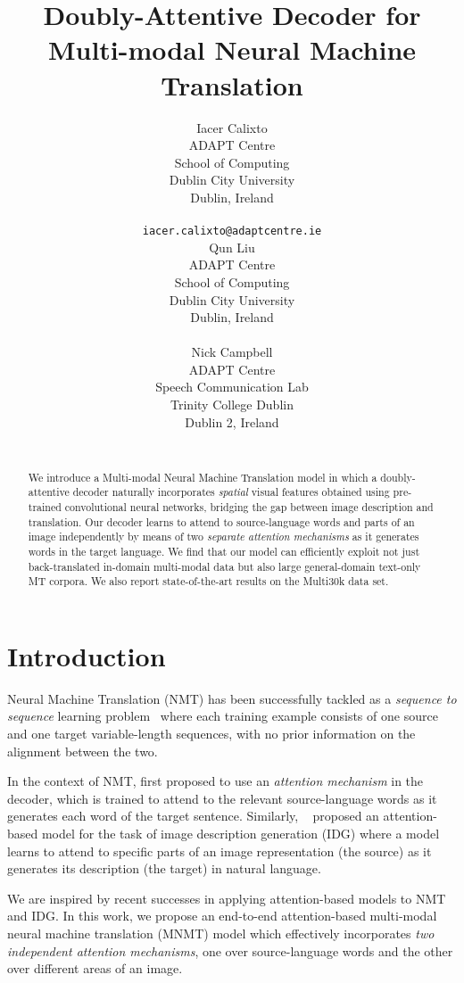 \documentclass[11pt]{article}
\title{Doubly-Attentive Decoder for Multi-modal Neural Machine Translation}
\author{Iacer Calixto \\
  ADAPT Centre\\
  School of Computing\\
  Dublin City University\\
  Dublin, Ireland\\
  \\
  {\tt {\small iacer.calixto@adaptcentre.ie}}\\
  \And
  Qun Liu \\
  ADAPT Centre\\
  School of Computing\\
  Dublin City University\\
  Dublin, Ireland\\
  \\
\And
  Nick Campbell \\
  ADAPT Centre\\
  Speech Communication Lab\\
  Trinity College Dublin\\
  Dublin 2, Ireland\\
  \\
}
\date{}
\begin{document}
\maketitle
\begin{abstract}
 We introduce a Multi-modal Neural Machine Translation model in which a doubly-attentive decoder naturally incorporates \emph{spatial} visual features obtained using pre-trained convolutional neural networks, bridging the gap between image description and translation.
 Our decoder learns to attend to source-language words and parts of an image independently by means of two \emph{separate attention mechanisms} as it generates words in the target language.
 We find that our model can efficiently exploit not just back-translated in-domain multi-modal data but also large general-domain text-only MT corpora.
 We also report state-of-the-art results on the Multi30k data set.
\end{abstract}

\section{Introduction}\label{sec:intro}

Neural Machine Translation (NMT) has been successfully tackled as a \emph{sequence to sequence} learning problem~\cite{KalchbrennerBlunsom2013,Choetal2014,SutskeverVinyalsLe2014} where each training example consists of one source and one target variable-length sequences, with no prior information on the alignment between the two.


In the context of NMT,  first proposed to use an \emph{attention mechanism} in the decoder, which is trained to attend to the relevant source-language words as it generates each word of the target sentence.
Similarly, ~ proposed an attention-based model for the task of image description generation (IDG) where a model learns to attend to specific parts of an image representation (the source) as it generates its description (the target) in natural language.

We are inspired by recent successes in applying attention-based models to NMT and IDG.
In this work, we propose an end-to-end attention-based multi-modal neural machine translation (MNMT) model which effectively incorporates \emph{two independent attention mechanisms}, one over source-language words and the other over different areas of an image.
\end{document}
